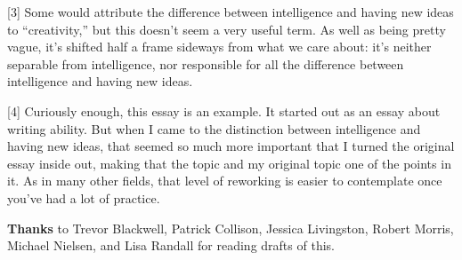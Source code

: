 {[}3{]} Some would attribute the difference between intelligence and
having new ideas to ``creativity,'' but this doesn't seem a very useful
term. As well as being pretty vague, it's shifted half a frame sideways
from what we care about: it's neither separable from intelligence, nor
responsible for all the difference between intelligence and having new
ideas.

{[}4{]} Curiously enough, this essay is an example. It started out as an
essay about writing ability. But when I came to the distinction between
intelligence and having new ideas, that seemed so much more important
that I turned the original essay inside out, making that the topic and
my original topic one of the points in it. As in many other fields, that
level of reworking is easier to contemplate once you've had a lot of
practice.

\textbf{Thanks} to Trevor Blackwell, Patrick Collison, Jessica
Livingston, Robert Morris, Michael Nielsen, and Lisa Randall for reading
drafts of this.
